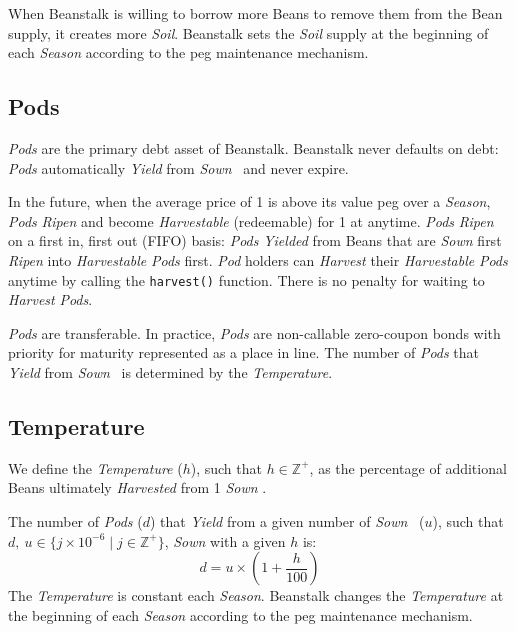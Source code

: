 \documentclass[tikz]{article}
\newcommand{\code}[1]{\texttt{#1}}
\newcommand{\term}[1]{\textsl{#1}}
\newcommand{\Bean}{} %
\begin{document}
When Beanstalk is willing to borrow more Beans to remove them from the Bean supply, it creates more \term{Soil}. Beanstalk sets the \term{Soil} supply at the beginning of each \term{Season} according to the peg maintenance mechanism.

\subsection{Pods}
\term{Pods} are the primary debt asset of Beanstalk. Beanstalk never defaults on debt: \term{Pods} automatically \term{Yield} from \term{Sown} \Bean\ and never expire.

In the future, when the average price of \Bean1 is above its value peg over a \term{Season}, \term{Pods} \term{Ripen} and become \term{Harvestable} (redeemable) for \Bean1 at anytime. \term{Pods} \term{Ripen} on a first in, first out (FIFO) basis: \term{Pods} \term{Yielded} from Beans that are \term{Sown} first \term{Ripen} into \term{Harvestable} \term{Pods} first. \term{Pod} holders can \term{Harvest} their \term{Harvestable} \term{Pods} anytime by calling the \code{harvest()} function. There is no penalty for waiting to \term{Harvest} \term{Pods}.

\term{Pods} are transferable. In practice, \term{Pods} are non-callable zero-coupon bonds with priority for maturity represented as a place in line. The number of \term{Pods} that \term{Yield} from \term{Sown} \Bean\ is determined by the \term{Temperature}.

\subsection{Temperature}
We define the \term{Temperature} ($h$), such that $h \in \mathbb{Z}^{+}$, as the percentage of additional Beans ultimately \term{Harvested} from 1 \term{Sown} \Bean. 

The number of \term{Pods} ($d$) that \term{Yield} from a given number of \term{Sown} \Bean\ ($u$), such that $d,\ u \in \{j \times 10^{-6} \mid j \in \mathbb{Z}^{+} \}$, \term{Sown} with a given $h$ is:
$$d = u \times \left(1 + \frac{h}{100}\right)$$
The \term{Temperature} is constant each \term{Season}. Beanstalk changes the \term{Temperature} at the beginning of each \term{Season} according to the peg maintenance mechanism.
\end{document}

